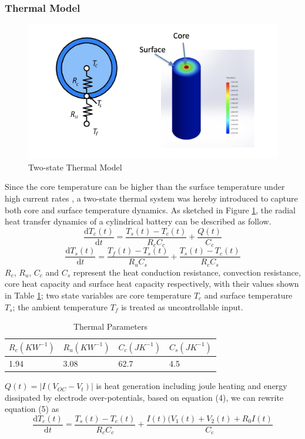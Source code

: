 \documentclass[12pt]{article}
\begin{document}
\subsubsection{Thermal Model}
\begin{figure}[H]
	\centering
	\includegraphics[height=0.3\textwidth]{figures/thermal.png}
	\caption{Two-state Thermal Model}
	\label{pi2}
\end{figure}
Since the core temperature can be higher than the surface temperature under high current rates \cite{ref:2}, a two-state thermal system was hereby introduced to capture both core and surface temperature dynamics. As sketched in Figure \ref{pi2}, the radial heat transfer dynamics of a cylindrical battery can be described as follow.
\begin{equation}
\frac{\mathrm{d}T_c(t)}{\mathrm{d} t} = \frac{T_s(t)-T_c(t)}{R_cC_c}+\frac{Q(t)}{C_c}
\end{equation}
\begin{equation}
\frac{\mathrm{d}T_s(t)}{\mathrm{d} t} = \frac{T_f(t)-T_s(t)}{R_uC_s}+\frac{T_s(t)-T_c(t)}{R_cC_s}
\end{equation}
$R_c$, $R_u$, $C_c$ and $C_s$ represent the heat conduction resistance, convection resistance, core heat capacity and surface heat capacity respectively, with their values shown in Table \ref{t5}; two state variables are core temperature $T_c$ and surface temperature $T_s$; the ambient temperature $T_f$ is treated as uncontrollable input. 
\begin{table}[H]
	\caption{Thermal Parameters}
	\vspace{-0.4cm}
	\centering
	\begin{tabular}{llll}
		\hline
		$R_{c}(KW^{-1})$ & $R_{u}(KW^{-1})$ & $C_{c}(JK^{-1})$ & $C_{s}(JK^{-1})$ \\
		\hline
		1.94 & 3.08 & 62.7 & 4.5  \\
		\hline
	\end{tabular}
	\label{t5}
\end{table}
\noindent $Q(t)=|I(V_{OC}-V_t)|$ is heat generation including joule heating and energy dissipated by electrode over-potentials, based on equation (4), we can rewrite equation (5) as
\begin{equation}
\frac{\mathrm{d}T_c(t)}{\mathrm{d} t} = \frac{T_s(t)-T_c(t)}{R_cC_c}+\frac{I(t)(V_1(t)+V_2(t)+R_0I(t)}{C_c}
\end{equation}
\end{document}
